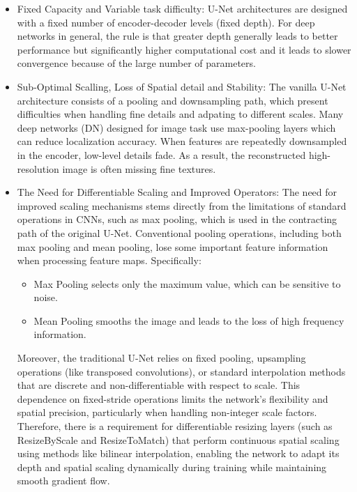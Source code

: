 \begin{itemize} 
    \item Fixed Capacity and Variable task difficulty: U-Net architectures are designed with a fixed number of encoder-decoder levels (fixed depth). For deep networks in general, the rule is that greater depth generally leads to better performance but significantly higher computational cost and it leads to slower convergence because of the large number of parameters. 
    \item Sub-Optimal Scalling, Loss of Spatial detail and Stability: The vanilla U-Net architecture consists of a pooling and downsampling path, which present difficulties when handling fine details and adpating to different scales. Many deep networks (DN) designed for image task use max-pooling layers which can reduce localization accuracy\cite{ronneberger2015unet}. When features are repeatedly downsampled in the encoder, low-level details fade. As a result, the reconstructed high-resolution image is often missing fine textures.
    \item The Need for Differentiable Scaling and Improved Operators: The need for improved scaling mechanisms stems directly from the limitations of standard operations in CNNs, such as max pooling, which is used in the contracting path of the original U-Net. Conventional pooling operations, including both max pooling and mean pooling, lose some important feature information when processing feature maps. Specifically: 
    \begin{itemize} 
        \item Max Pooling selects only the maximum value, which can be sensitive to noise. 
        \item Mean Pooling smooths the image and leads to the loss of high frequency information. \end{itemize} 
    Moreover, the traditional U-Net relies on fixed pooling, upsampling operations (like transposed convolutions), or standard interpolation methods that are discrete and non-differentiable with respect to scale. This dependence on fixed-stride operations limits the network's flexibility and spatial precision, particularly when handling non-integer scale factors. Therefore, there is a requirement for differentiable resizing layers (such as ResizeByScale and ResizeToMatch) that perform continuous spatial scaling using methods like bilinear interpolation, enabling the network to adapt its depth and spatial scaling dynamically during training while maintaining smooth gradient flow. 
\end{itemize}


